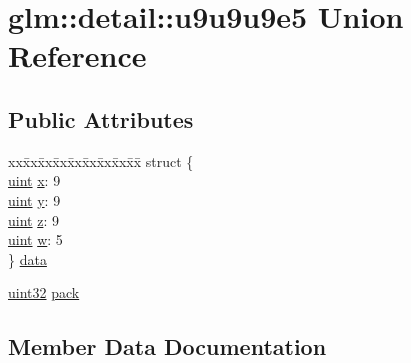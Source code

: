 \hypertarget{unionglm_1_1detail_1_1u9u9u9e5}{}\section{glm\+:\+:detail\+:\+:u9u9u9e5 Union Reference}
\label{unionglm_1_1detail_1_1u9u9u9e5}
\subsection*{Public Attributes}
\begin{DoxyCompactItemize}
\item 
\begin{tabbing}
xx\=xx\=xx\=xx\=xx\=xx\=xx\=xx\=xx\=\kill
struct \{\\
\>\mbox{\hyperlink{group__core__precision_ga4fd29415871152bfb5abd588334147c8}{uint}} \mbox{\hyperlink{unionglm_1_1detail_1_1u9u9u9e5_a6cca809221a0d479ce9878bfca62ad49}{x}}: 9\\
\>\mbox{\hyperlink{group__core__precision_ga4fd29415871152bfb5abd588334147c8}{uint}} \mbox{\hyperlink{unionglm_1_1detail_1_1u9u9u9e5_ae11f1138214a146e8462f2c022350254}{y}}: 9\\
\>\mbox{\hyperlink{group__core__precision_ga4fd29415871152bfb5abd588334147c8}{uint}} \mbox{\hyperlink{unionglm_1_1detail_1_1u9u9u9e5_a9eacfe6494175ce78b6e516746bb63b7}{z}}: 9\\
\>\mbox{\hyperlink{group__core__precision_ga4fd29415871152bfb5abd588334147c8}{uint}} \mbox{\hyperlink{unionglm_1_1detail_1_1u9u9u9e5_afadc52b82254e8969b5e83601309f668}{w}}: 5\\
\} \mbox{\hyperlink{unionglm_1_1detail_1_1u9u9u9e5_ab27d3c628cb4c4f6c635de506bb1dc60}{data}}\\

\end{tabbing}\item 
\mbox{\hyperlink{namespaceglm_1_1detail_ade6cfbf377022aaa391af8cd50489222}{uint32}} \mbox{\hyperlink{unionglm_1_1detail_1_1u9u9u9e5_a76c0b28299b57da27b9e023091ae9c32}{pack}}
\end{DoxyCompactItemize}


\subsection{Member Data Documentation}
\mbox{\label{unionglm_1_1detail_1_1u9u9u9e5_ab27d3c628cb4c4f6c635de506bb1dc60}} 
